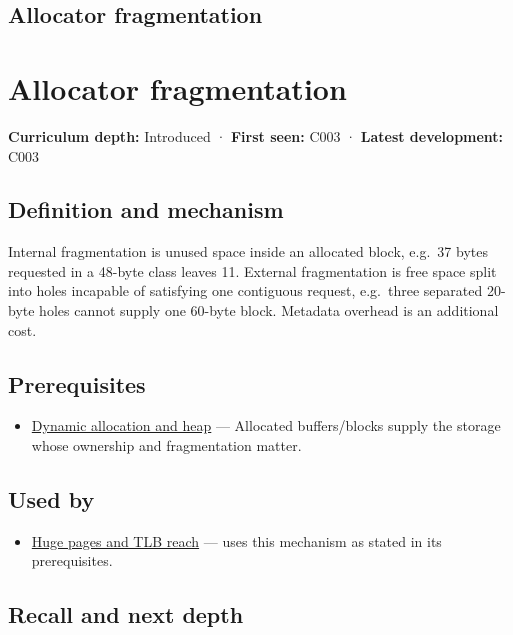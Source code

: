 \hypertarget{appendix-a7c50686d81f}{}
\section*{Allocator fragmentation}
\chapter{Allocator fragmentation}\label{appendix-a7c50686d81f-allocator-fragmentation}

\textbf{Curriculum depth:} Introduced · \textbf{First seen:} C003 · \textbf{Latest development:} C003

\section{Definition and mechanism}\label{appendix-a7c50686d81f-definition-and-mechanism}

Internal fragmentation is unused space inside an allocated block, e.g.~37 bytes requested in a 48-byte class leaves 11. External fragmentation is free space split into holes incapable of satisfying one contiguous request, e.g.~three separated 20-byte holes cannot supply one 60-byte block. Metadata overhead is an additional cost.

\section{Prerequisites}\label{appendix-a7c50686d81f-prerequisites}

\begin{itemize}
\tightlist
\item
  \hyperref[appendix-c3480f7d9ff3]{Dynamic allocation and heap} --- Allocated buffers/blocks supply the storage whose ownership and fragmentation matter.
\end{itemize}

\section{Used by}\label{appendix-a7c50686d81f-used-by}

\begin{itemize}
\tightlist
\item
  \hyperref[appendix-ce688d1acdab]{Huge pages and TLB reach} --- uses this mechanism as stated in its prerequisites.
\end{itemize}

\section{Recall and next depth}\label{appendix-a7c50686d81f-recall-and-next-depth}

